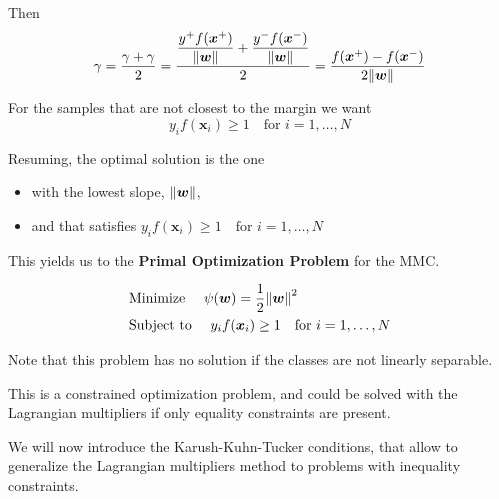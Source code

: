 \documentclass[oneside,onecolumn]{report}
\begin{document}
Then
$$ \gamma = \frac{\gamma + \gamma}{2} = \frac{\displaystyle \frac{y^+ f(\bm x^+)}{\norm{\bm w}} + \frac{y^- f(\bm x^-)}{\norm{\bm w}}}{2} = \frac{f(\bm x^+) - f(\bm x^-)}{2 \norm{\bm w}} $$

For the samples that are not closest to the margin we want
$$ y_i f(\bm x_i) \geq 1 \quad \text{for } i = 1, \dots, N $$

Resuming, the optimal solution is the one
\begin{itemize}
    \item with the lowest slope, $\norm{\bm w}$,
    \item and that satisfies $y_i f(\bm x_i) \geq 1 \quad \text{for } i = 1, \dots, N $
\end{itemize}

This yields us to the \textbf{Primal Optimization Problem} for the MMC.

\begin{align*}
    &\text{Minimize   } \quad \psi(\bm w) = \frac{1}{2} \norm{\bm w}^2 \\
    &\text{Subject to } \quad y_i f(\bm x_i) \geq 1 \quad \text{for } i = 1, \dots, N
\end{align*}

Note that this problem has no solution if the classes are not linearly separable.

This is a constrained optimization problem, and could be solved with the Lagrangian multipliers if only equality constraints are present.

We will now introduce the Karush-Kuhn-Tucker conditions, that allow to generalize the Lagrangian multipliers method to problems with inequality constraints.
\end{document}
